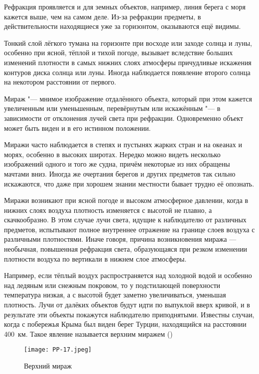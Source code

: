 Рефракция проявляется и для земных объектов, например, линия берега с
моря кажется выше, чем на самом деле. Из-за рефракции предметы, в
действительности находящиеся уже за горизонтом, оказываются ещё
видимы.

Тонкий слой лёгкого тумана на горизонте при восходе или заходе солнца
и луны, особенно при ясной, тёплой и тихой погоде, вызывает вследствие
больших изменений плотности в самых нижних слоях атмосферы причудливые
искажения контуров диска солнца или луны. Иногда наблюдается появление
второго солнца на некотором расстоянии от первого.

Мираж "--- мнимое изображение отдалённого объекта, который при этом
кажется увеличенным или уменьшенным, перевёрнутым или искажённым "--- в
зависимости от отклонения лучей света при рефракции. Одновременно
объект может быть виден и в его истинном положении.

Миражи часто наблюдается в степях и пустынях жарких стран и на океанах
и морях, особенно в высоких широтах. Нередко можно видеть несколько
изображений одного и того же судна, причём некоторые из них обращены
мачтами вниз. Иногда же очертания берегов и других предметов так
сильно искажаются, что даже при хорошем знании местности бывает трудно
её опознать.

Миражи возникают при ясной погоде и высоком атмосферное давлении,
когда в нижних слоях воздуха плотность изменяется с высотой не плавно,
а скачкообразно. В этом случае лучи света, идущие к наблюдателю от
различных предметов, испытывают полное внутреннее отражение на границе
слоев воздуха с различными плотностями. Иначе говоря, причина
возникновения миража — необычная, повышенная рефракция света,
образующаяся при резком изменении плотности воздуха по вертикали в
нижнем слое атмосферы.

Например, если тёплый воздух распространяется над холодной водой и
особенно над ледяным или снежным покровом, то у подстилающей
поверхности температура низкая, а с высотой будет заметно
увеличиваться, уменьшая плотность. Лучи от далёких объектов будут идти
по выпуклой вверх кривой, и в результате эти объекты покажутся
наблюдателю приподнятыми. Известны случаи, когда с побережья Крыма был
виден берег Турции, находящийся на расстоянии 400~км. Такое явление
называется верхним миражем ()

\begin{figure}[htb]
  \centering{}
  \texttt{[image: PP-17.jpeg]}
  \caption{Верхний мираж}
  \label{fig:pp17}
  \small
  \centering{}
\end{figure}

